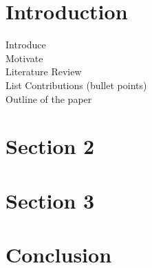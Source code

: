 \documentclass[journal]{IEEEtran}
\begin{document}
\section{Introduction}
Introduce \\
Motivate \\
Literature Review\\
List Contributions (bullet points)\\
Outline of the paper\\
%


\section{Section 2}

\section{Section 3}
\section{Conclusion}\label{sec:conclusion}

%

\ifCLASSOPTIONcaptionsoff
  \newpage
\fi


\end{document}
